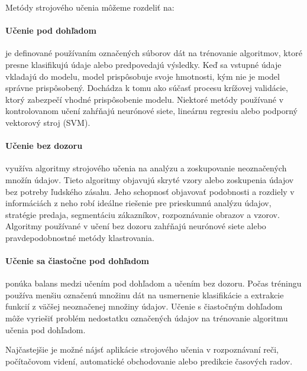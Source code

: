 Metódy strojového učenia môžeme rozdeliť na:
\paragraph{Učenie pod dohľadom} je definované používaním označených súborov dát na trénovanie algoritmov, ktoré presne klasifikujú údaje alebo predpovedajú výsledky. Keď sa vstupné údaje vkladajú do modelu, model prispôsobuje svoje hmotnosti, kým nie je model správne prispôsobený. Dochádza k tomu ako súčasť procesu krížovej validácie, ktorý zabezpečí vhodné prispôsobenie modelu. Niektoré metódy používané v kontrolovanom učení zahŕňajú neurónové siete, lineárnu regresiu alebo podporný vektorový stroj (SVM).

\paragraph{Učenie bez dozoru} využíva algoritmy strojového učenia na analýzu a zoskupovanie neoznačených množín údajov. Tieto algoritmy objavujú skryté vzory alebo zoskupenia údajov bez potreby ľudského zásahu. Jeho schopnosť objavovať podobnosti a rozdiely v informáciách z neho robí ideálne riešenie pre prieskumnú analýzu údajov, stratégie predaja, segmentáciu zákazníkov, rozpoznávanie obrazov a vzorov. Algoritmy používané v učení bez dozoru zahŕňajú neurónové siete alebo pravdepodobnostné metódy klastrovania.

\paragraph{Učenie sa čiastočne pod dohľadom} ponúka balans medzi učením pod dohľadom a učením bez dozoru. Počas tréningu používa menšiu označenú množinu dát na usmernenie klasifikácie a extrakcie funkcií z väčšej neoznačenej množiny údajov. Učenie s čiastočným dohľadom môže vyriešiť problém nedostatku označených údajov na trénovanie algoritmu učenia pod dohľadom.

Najčastejšie je možné nájsť aplikácie strojového učenia v rozpoznávaní reči, počítačovom videní, automatické obchodovanie alebo predikcie časových radov.

